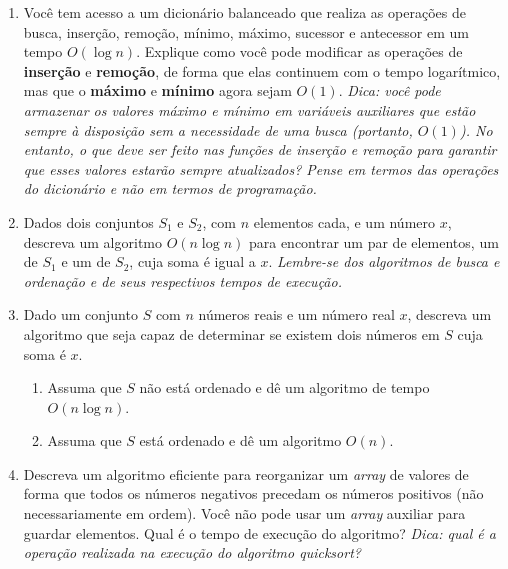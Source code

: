 \documentclass[a4paper,10pt]{article}
\begin{document}
\begin{multicols*}{2}
\begin{enumerate}
  \item Você tem acesso a um dicionário balanceado que realiza as operações  de busca, inserção, remoção, mínimo, máximo, sucessor e antecessor em um tempo $O(\log{n})$. Explique como você pode modificar as operações de \textbf{inserção} e \textbf{remoção}, de forma que elas continuem com o tempo logarítmico, mas que o \textbf{máximo} e \textbf{mínimo} agora sejam $O(1)$. \textit{Dica: você pode armazenar os valores máximo e mínimo em variáveis auxiliares que estão sempre à disposição sem a necessidade de uma busca (portanto, $O(1)$). No entanto, o que deve ser feito nas funções de inserção e remoção para garantir que esses valores estarão sempre atualizados? Pense em termos das operações do dicionário e não em termos de programação.}

  \item Dados dois conjuntos $S_1$ e $S_2$, com $n$ elementos cada, e um número $x$, descreva um algoritmo $O(n\log{n})$ para encontrar um par de elementos, um de $S_1$ e um de $S_2$, cuja soma é igual a $x$. \textit{Lembre-se dos algoritmos de busca e ordenação e de seus respectivos tempos de execução.}

  \item Dado um conjunto $S$ com $n$ números reais e um número real $x$, descreva um algoritmo que seja capaz de determinar se existem dois números em $S$ cuja soma é $x$.

    \begin{enumerate}
      \item Assuma que $S$ não está ordenado e dê um algoritmo de tempo $O(n \log{n})$.
      \item Assuma que $S$ está ordenado e dê um algoritmo $O(n)$.
    \end{enumerate}

  \item Descreva um algoritmo eficiente para reorganizar um \textit{array} de valores de forma que todos os números negativos precedam os números positivos (não necessariamente em ordem). Você não pode usar um \textit{array} auxiliar para guardar elementos. Qual é o tempo de execução do algoritmo? \textit{Dica: qual é a operação realizada na execução do algoritmo quicksort?}
\end{enumerate}
\end{multicols*}
\end{document}
